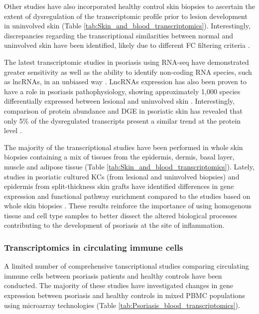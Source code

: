 Other studies have also incorporated healthy control skin biopsies to ascertain the extent of dysregulation of the transcriptomic profile prior to lesion development in uninvolved skin (Table \ref{tab:Skin_and_blood_transcriptomics}). Interestingly, discrepancies regarding the transcriptional similarities between normal and uninvolved skin have been identified, likely due to different FC filtering criteria \parencite{Keermann2015, Tsoi2015}.%

The latest transcriptomic studies in psoriasis using RNA-seq have demonstrated greater sensitivity as well as the ability to identify non-coding RNA species, such as lncRNAs, in an unbiased way \parencite{Jaabari2011, Li2014}. LncRNAs expression has also been proven to have a role in psoriasis pathophysiology, showing approximately 1,000 species differentially expressed between lesional and uninvolved skin \parencite{Tsoi2015}. Interestingly, comparison of protein abundance and DGE in psoriatic skin has revealed that only 5\% of the dysregulated transcripts present a similar trend at the protein level \parencite{Swindell2015}.   

The majority of the transcriptional studies have been performed in whole skin biopsies containing a mix of tissues from the epidermis, dermis, basal layer, muscle and adipose tissue (Table \ref{tab:Skin_and_blood_transcriptomics}). Lately, studies in psoriatic cultured KCs (from lesional and uninvolved biopsies) and epidermis from split-thickness skin grafts have identified differences in gene expression and functional pathway enrichment compared to the studies based on whole skin biopsies \parencite{Swindell2017,Tervaniemi2016}. These results reinforce the importance of using homogenous tissue and cell type samples to better dissect the altered biological processes contributing to the development of psoriasis at the site of inflammation. 


\subsubsection{Transcriptomics in circulating immune cells}
A limited number of comprehensive tanscriptional studies comparing circulating immune cells between psoriasis patients and healthy controls have been conducted. The majority of these studies have investigated changes in gene expression between psoriasis and healthy controls in mixed PBMC populations using microarray technologies (Table \ref{tab:Psoriasis_blood_transcriptomics}). 


